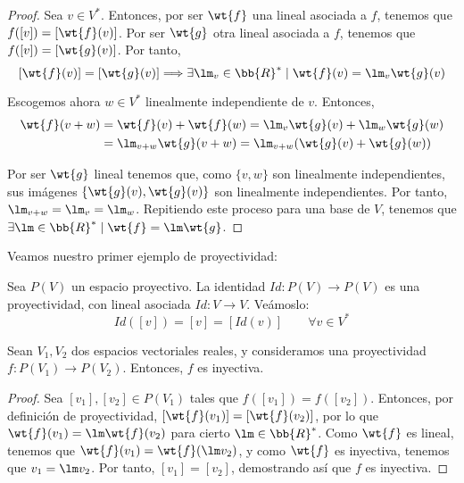 \begin{proof}
    Sea $v\in V^\ast$. Entonces, por ser $\wt{f}$ una lineal asociada a $f$, tenemos que $f([v])=\left[\wt{f}(v)\right]$.
    Por ser $\wt{g}$ otra lineal asociada a $f$, tenemos que $f([v])=[\wt{g}(v)]$. Por tanto,
    \begin{equation*}
        \left[\wt{f}(v)\right]=[\wt{g}(v)] \Longrightarrow \exists \lm_v \in \bb{R}^\ast \mid \wt{f}(v)=\lm_v \wt{g}(v)
    \end{equation*}

    Escogemos ahora $w\in V^\ast$ linealmente independiente de $v$. Entonces,
    \begin{equation*}
        \begin{split}
            \wt{f}(v+w) &= \wt{f}(v) + \wt{f}(w) = \lm_v \wt{g}(v) + \lm _w \wt{g}(w)\\
            &= \lm_{v+w} \wt{g}(v+w) = \lm_{v+w} (\wt{g}(v) + \wt{g}(w))
        \end{split}
    \end{equation*}

    Por ser $\wt{g}$ lineal tenemos que, como $\{v,w\}$ son linealmente independientes, sus imágenes $\{\wt{g}(v), \wt{g}(v)\}$ son linealmente independientes. Por tanto, $\lm_{v+w} = \lm_v = \lm_w$.
    Repitiendo este proceso para una base de $V$, tenemos que $\exists \lm \in \bb{R}^\ast \mid \wt{f}=\lm \wt{g}$.
\end{proof}

Veamos nuestro primer ejemplo de proyectividad:
\begin{ejemplo}
    Sea $P(V)$ un espacio proyectivo. La identidad $Id:P(V)\to P(V)$ es una proyectividad, con lineal asociada $Id:V\to V$.
    Veámoslo:
    \begin{equation*}
        Id([v]) = [v] = \left[Id(v)\right] \qquad \forall v\in V^\ast
    \end{equation*}
\end{ejemplo}


\begin{prop}
    Sean $V_1,V_2$ dos espacios vectoriales reales, y consideramos una proyectividad $f:P(V_1)\to P(V_2)$. Entonces, $f$ es inyectiva.
\end{prop}
\begin{proof}
    Sea $[v_1],[v_2]\in P(V_1)$ tales que $f([v_1])=f([v_2])$. Entonces, por definición de proyectividad, $\left[\wt{f}(v_1)\right]=\left[\wt{f}(v_2)\right]$, por lo que $\wt{f}(v_1)=\lm \wt{f}(v_2)$ para cierto $\lm \in \bb{R}^\ast$.
    Como $\wt{f}$ es lineal, tenemos que $\wt{f}(v_1) = \wt{f}(\lm v_2)$, y como $\wt{f}$ es inyectiva, tenemos que $v_1 = \lm v_2$. Por tanto, $[v_1]=[v_2]$, demostrando así que $f$ es inyectiva.
\end{proof}




